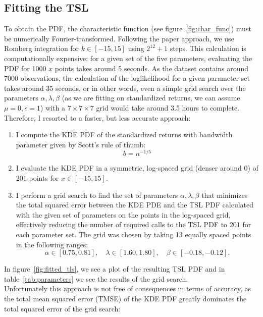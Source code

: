 \documentclass[11pt]{article}
\begin{document}
        \subsection{Fitting the TSL}\label{subsec:fitting-the-tsl}
    To obtain the PDF, the characteristic function (see figure~\ref{fig:char_func}) must be numerically Fourier-transformed.
        Following the paper approach, we use Romberg integration for $k \in [-15, 15]$ using $2^{12}+1$ steps.
        This calculation is computationally expensive: for a given set of the five parameters, evaluating the PDF for 1000 $x$ points takes around 5 seconds.
        As the dataset contains around 7000 observations, the calculation of the loglikelihood for a given parameter set takes around 35 seconds, or in other words,
        even a simple grid search over the parameters $\alpha, \lambda, \beta$ (as we are fitting on standardized returns, we can assume $\mu=0, c=1$) with a $7\times 7\times 7$ grid would take around 3.5 hours to complete.
        Therefore, I resorted to a faster, but less accurate approach:
        \begin{enumerate}
            \item I compute the KDE PDF of the standardized returns with bandwidth parameter given by Scott’s rule of thumb:
                    $$b = n^{-1/5}$$
            \item I evaluate the KDE PDF in a symmetric, log-spaced grid (denser around $0$) of $201$ points for $x\in [-15,15]$.
            \item I perform a grid search to find the set of parameters $\alpha, \lambda, \beta$ that minimizes the total squared error
                between the KDE PDE and the TSL PDF calculated with the given set of parameters on the points in the log-spaced grid,
                effectively reducing the number of required calls to the TSL PDF to $201$ for each parameter set.
                The grid was chosen by taking 13 equally spaced points in the following ranges:
                $$ \alpha \in [0.75,0.81], \quad \lambda \in [1.60,1.80], \quad \beta \in [-0.18,-0.12].$$
        \end{enumerate}
        In figure~\ref{fig:fitted_tls}, we see a plot of the resulting TSL PDF and in table~\ref{tab:parameters} we see the results of the grid search.\\
        Unfortunately this approach is not free of consequences in terms of accuracy, as the total mean squared error (TMSE) of the KDE PDF greatly dominates the total squared error of the grid search:
\end{document}
